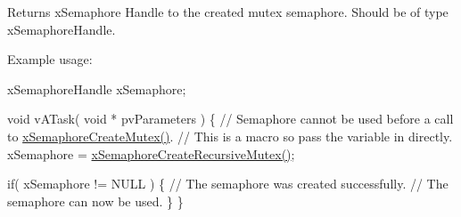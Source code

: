 \begin{DoxyReturn}{Returns}
x\+Semaphore Handle to the created mutex semaphore. Should be of type x\+Semaphore\+Handle.
\end{DoxyReturn}
Example usage\+: 
\begin{DoxyPre}
xSemaphoreHandle xSemaphore;\end{DoxyPre}



\begin{DoxyPre}void vATask( void * pvParameters )
\{
   // Semaphore cannot be used before a call to \hyperlink{semphr_8h_aa6a00aa9b91a9e5b3ebe4ae1c3f115c6}{xSemaphoreCreateMutex()}.
   // This is a macro so pass the variable in directly.
   xSemaphore = \hyperlink{semphr_8h_a1bbc843be5a41ea83d2693b2189fc0f8}{xSemaphoreCreateRecursiveMutex()};\end{DoxyPre}



\begin{DoxyPre}   if( xSemaphore != NULL )
   \{
       // The semaphore was created successfully.
       // The semaphore can now be used.  
   \}
\}
\end{DoxyPre}
 